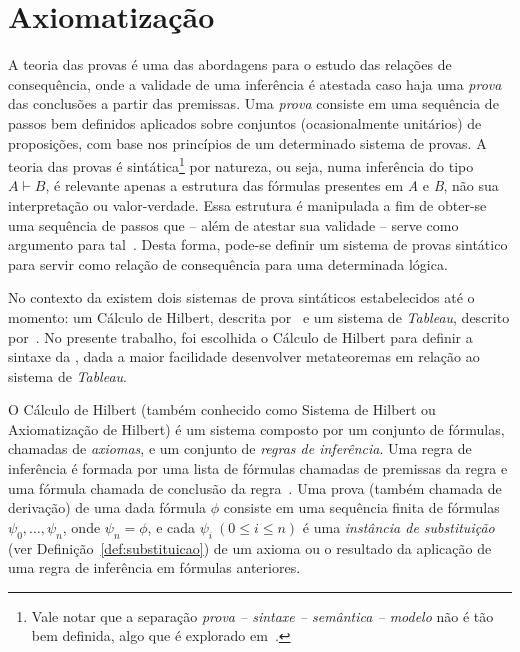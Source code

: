 \section{Axiomatização}
\label{sec:axiomatizacao}

    A teoria das provas é uma das abordagens para o estudo das relações de consequência, onde a validade de uma inferência é atestada caso haja uma \textit{prova} das conclusões a partir das premissas. Uma \textit{prova} consiste em uma sequência de passos bem definidos aplicados sobre conjuntos (ocasionalmente unitários) de proposições, com base nos princípios de um determinado sistema de provas. A teoria das provas é sintática\footnote{Vale notar que a separação \textit{prova {--} sintaxe {--} semântica {--} modelo} não é tão bem definida, algo que é explorado em~.} por natureza, ou seja, numa inferência do tipo $A \vdash B$, é relevante apenas a estrutura das fórmulas presentes em \textit{A} e \textit{B}, não sua interpretação ou valor-verdade. Essa estrutura é manipulada a fim de obter-se uma sequência de passos que {--} além de atestar sua validade {--} serve como argumento para tal~\cite{sep-logical-consequence}. Desta forma, pode-se definir um sistema de provas sintático para servir como relação de consequência para uma determinada lógica. 

    No contexto da \lfium{} existem dois sistemas de prova sintáticos estabelecidos até o momento: um Cálculo de Hilbert, descrita por~ e um sistema de \textit{Tableau}, descrito por~. No presente trabalho, foi escolhida o Cálculo de Hilbert para definir a sintaxe da \lfium{}, dada a maior facilidade desenvolver metateoremas em relação ao sistema de \textit{Tableau}.

    O Cálculo de Hilbert (também conhecido como Sistema de Hilbert ou Axiomatização de Hilbert) é um sistema composto por um conjunto de fórmulas, chamadas de \textit{axiomas}, e um conjunto de \textit{regras de inferência}. Uma regra de inferência é formada por uma lista de fórmulas chamadas de premissas da regra e uma fórmula chamada de conclusão da regra~\cite{Restall1999-RESAIT-4}. Uma prova (também chamada de derivação) de uma dada fórmula $\phi$ consiste em uma sequência finita de fórmulas \(\psi_0, \dots, \psi_n\), onde \(\psi_n = \phi\), e cada  $\psi_i\ (0 \leq i \leq n)$ é uma \textit{instância de substituição} (ver Definição~\ref{def:substituicao}) de um axioma ou o resultado da aplicação de uma regra de inferência em fórmulas anteriores.
    
